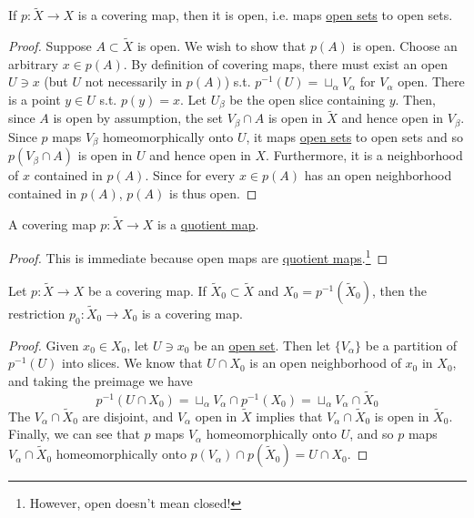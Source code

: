   \begin{theorem}
    \label{thm:covering-maps-are-open-maps}
    If $p: \widetilde{X} \to X$ is a covering map, then it is open, i.e. maps \hyperref[pst-def:open-set]{open sets} to open sets.
  \end{theorem}
  \begin{proof}
    Suppose $A \subset \widetilde{X}$ is open. We wish to show that $p(A)$ is open. Choose an arbitrary $x \in p(A)$. By definition of covering maps, there must exist an open $U \ni x$ (but $U$ not necessarily in $p(A)$) s.t. $p^{-1} (U) = \sqcup_\alpha V_\alpha$ for $V_\alpha$ open. There is a point $y \in U$ s.t. $p(y) = x$. Let $U_\beta$ be the open slice containing $y$. Then, since $A$ is open by assumption, the set $V_\beta \cap A$ is open in $\widetilde{X}$ and hence open in $V_\beta$. Since $p$ maps $V_\beta$ homeomorphically onto $U$, it maps \hyperref[pst-def:open-set]{open sets} to open sets and so $p(V_\beta \cap A)$ is open in $U$ and hence open in $X$. Furthermore, it is a neighborhood of $x$ contained in $p(A)$. Since for every $x \in p(A)$ has an open neighborhood contained in $p(A)$, $p(A)$ is thus open. 
  \end{proof}

  \begin{corollary}
    \label{thm:covering-maps-are-quotient-maps}
    A covering map $p: \widetilde{X} \to X$ is a \hyperref[pst-def:quotient-map]{quotient map}.
  \end{corollary}
  \begin{proof}
    This is immediate because open maps are \hyperref[pst-def:quotient-map]{quotient maps}.\footnote{However, open doesn't mean closed!} 
  \end{proof}

  \begin{theorem}
    \label{thm:restriction-of-covering-maps}
    Let $p: \widetilde{X} \to X$ be a covering map. If $\widetilde{X}_0 \subset \widetilde{X}$ and $X_0 = p^{-1}(\widetilde{X}_0)$, then the restriction $p_0: \widetilde{X}_0 \to X_0$ is a covering map.
  \end{theorem}
  \begin{proof}
    Given $x_0 \in X_0$, let $U \ni x_0$ be an \hyperref[pst-def:open-set]{open set}. Then let $\{V_\alpha\}$ be a partition of $p^{-1} (U)$ into slices. We know that $U \cap X_0$ is an open neighborhood of $x_0$ in $X_0$, and taking the preimage we have 
    \begin{equation}
      p^{-1} (U \cap X_0) = \sqcup_\alpha V_\alpha \cap p^{-1} (X_0) = \sqcup_\alpha V_\alpha \cap \widetilde{X}_0
    \end{equation}
    The $V_\alpha \cap \widetilde{X}_0$ are disjoint, and $V_\alpha$ open in $\widetilde{X}$ implies that $V_\alpha \cap \widetilde{X}_0$ is open in $\widetilde{X}_0$. Finally, we can see that $p$ maps $V_\alpha$ homeomorphically onto $U$, and so $p$ maps $V_\alpha \cap \widetilde{X}_0$ homeomorphically onto $p(V_\alpha) \cap p(\widetilde{X}_0) = U \cap X_0$.
  \end{proof}

